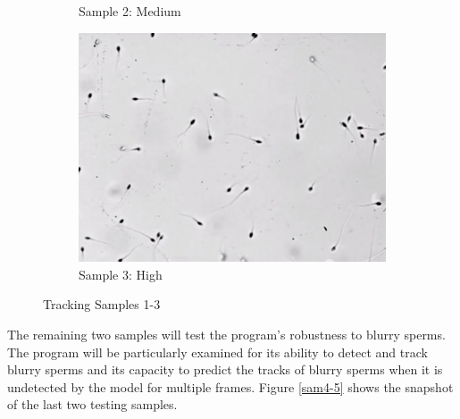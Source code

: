 \begin{figure}[h]
\begin{subfigure}[b]{0.31\textwidth}
         \caption{Sample 2: Medium}
         \label{sam2}
     \end{subfigure}
     \hfill
     \begin{subfigure}[b]{0.31\textwidth}
         \centering
         \includegraphics[width=\textwidth]{Images/high.png}
         \caption{Sample 3: High}
         \label{sam3}
     \end{subfigure}
        \caption{Tracking Samples 1-3}
        \label{sam1-3}
\end{figure}

The remaining two samples will test the program's robustness to blurry sperms. The program will be particularly examined for its ability to detect and track blurry sperms and its capacity to predict the tracks of blurry sperms when it is undetected by the model for multiple frames. Figure \ref{sam4-5} shows the snapshot of the last two testing samples.

